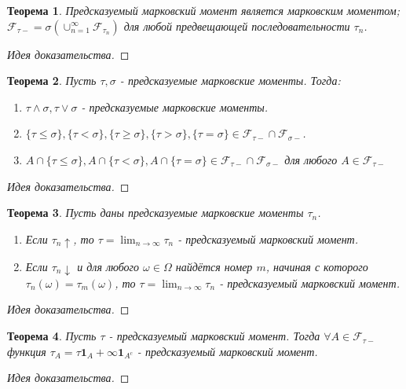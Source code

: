 \documentclass[16pt]{article}
\newtheorem{theorem}{Теорема}[section]
\theoremstyle{definition}
\begin{document}
\begin{theorem}
Предсказуемый марковский момент является марковским моментом; $\mathcal{F}_{\tau-} = \sigma(\cup_{n = 1}^\infty \mathcal{F}_{\tau_n})$ для любой предвещающей последовательности $\tau_n$.
\end{theorem}
\begin{proof}[Идея доказательства]

\end{proof}
\begin{theorem}
Пусть $\tau, \sigma$ - предсказуемые марковские моменты. Тогда:
\begin{enumerate}
    \item $\tau \wedge \sigma, \tau \vee \sigma$ - предсказуемые марковские моменты.
    \item $\{\tau \le \sigma\}, \{\tau < \sigma\}, \{\tau \ge \sigma\}, \{\tau > \sigma\}, \{\tau = \sigma\} \in \mathcal{F}_{\tau-}\cap\mathcal{F}_{\sigma-}$.
    \item $A \cap \{\tau \le \sigma\}, A \cap \{\tau < \sigma\}, A \cap \{\tau = \sigma\} \in \mathcal{F}_{\tau-}\cap\mathcal{F}_{\sigma-}$ для любого $A \in \mathcal{F}_{\tau-}$
\end{enumerate}
\end{theorem}
\begin{proof}[Идея доказательства]

\end{proof}
\begin{theorem}
Пусть даны предсказуемые марковские моменты $\tau_n$.
\begin{enumerate}
    \item Если $\tau_n \uparrow$, то $\tau = \lim_{n \rightarrow \infty}\tau_n$ - предсказуемый марковский момент.
    \item Если $\tau_n \downarrow$ и для любого $\omega \in \Omega$ найдётся номер $m$, начиная с которого $\tau_n(\omega) = \tau_m(\omega)$, то $\tau = \lim_{n \rightarrow \infty}\tau_n$ - предсказуемый марковский момент.
\end{enumerate}
\end{theorem}
\begin{proof}[Идея доказательства]

\end{proof}
\begin{theorem}
Пусть $\tau$ - предсказуемый марковский момент. Тогда $\forall A \in \mathcal{F}_{\tau-}$ функция $\tau_A = \tau\mathbf{1}_A + \infty\mathbf{1}_{A^c}$ - предсказуемый марковский момент.
\end{theorem}
\begin{proof}[Идея доказательства]

\end{proof}
\end{document}
